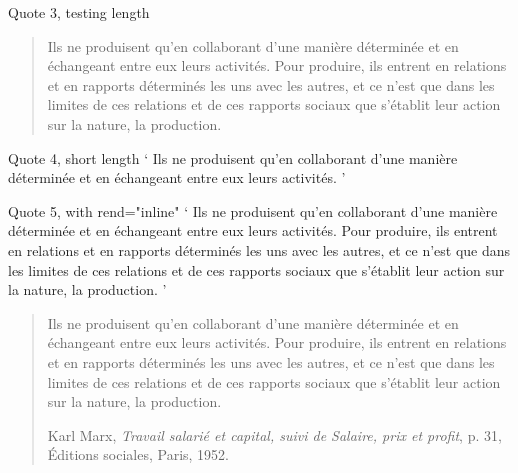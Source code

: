 \documentclass[11pt,twoside]{article}\makeatletter
\begin{document}
Quote 3, testing length 	  \begin{quote} 	    Ils ne produisent qu’en collaborant d’une manière déterminée et en échangeant entre eux leurs activités. 	    Pour produire, ils entrent en relations et en rapports déterminés les uns avec les autres, 	    et ce n’est que dans les limites de ces relations et de ces rapports sociaux 	    que s’établit leur action sur la nature, la production. 	  \end{quote} 	\par
Quote 4, short length 	  ‘ 	    Ils ne produisent qu’en collaborant d’une manière déterminée et en échangeant entre eux leurs activités. 	  ’ 	\par
Quote 5, with rend="inline" 	  ‘ 	    Ils ne produisent qu’en collaborant d’une manière déterminée et en échangeant entre eux leurs activités. 	    Pour produire, ils entrent en relations et en rapports déterminés les uns avec les autres, 	    et ce n’est que dans les limites de ces relations et de ces rapports sociaux 	    que s’établit leur action sur la nature, la production. 	  ’ 	
\begin{quote}
 	    \par
Ils ne produisent qu’en collaborant d’une manière déterminée et en échangeant entre eux leurs activités. 	    Pour produire, ils entrent en relations et en rapports déterminés les uns avec les autres, 	    et ce n’est que dans les limites de ces relations et de ces rapports sociaux 	    que s’établit leur action sur la nature, la production. 	  \par
 	    Karl Marx, 	    \textit{Travail salarié et capital, suivi de Salaire, prix et profit}, 	    p. 31, 	    Éditions sociales, 	    Paris, 	    1952.
\end{quote}
\end{document}
